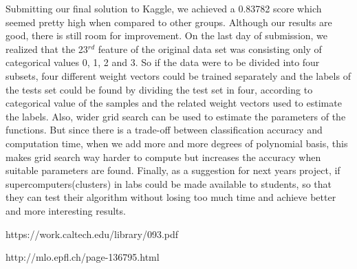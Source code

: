 \documentclass[journal]{IEEEtran}
\begin{document}
Submitting our final solution to Kaggle, we achieved a 0.83782 score which seemed pretty high when compared to other groups. Although our results are good, there is still room for improvement. On the last day of submission, we realized that the 23$^{rd}$ feature of the original data set was consisting only of categorical values 0, 1, 2 and 3. So if the data were to be divided into four subsets, four different weight vectors could be trained separately and the labels of the tests set could be found by dividing the test set in four, according to categorical value of the samples and the related weight vectors used to estimate the labels. Also, wider grid search can be used to estimate the parameters of the functions. But since there is a trade-off between classification accuracy and computation time, when we add more and more degrees of polynomial basis, this makes grid search way harder to compute but increases the accuracy when suitable parameters are found. Finally, as a suggestion for next years project, if supercomputers(clusters) in labs could be made available to students, so that they can test their algorithm without losing too much time and achieve better and more interesting results.






\ifCLASSOPTIONcaptionsoff
  \newpage
\fi



\begin{thebibliography}{1}

https://work.caltech.edu/library/093.pdf

http://mlo.epfl.ch/page-136795.html


\end{thebibliography}
\end{document}
